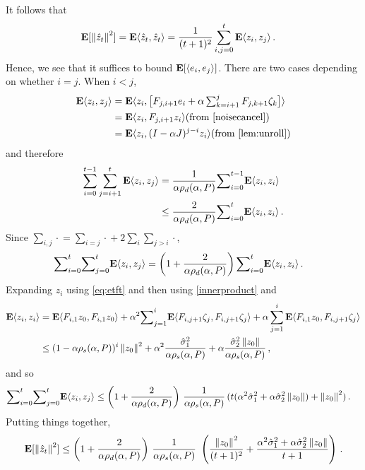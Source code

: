 It follows that 
\begin{align*}
\mathbf{E}[\left\| \hat{z}_t\right\|^2]&=\mathbf{E}\langle\hat{z}_t,\hat{z}_t\rangle
=\frac{1}{(t+1)^2} \sum_{i,j=0}^t \mathbf{E}\langle z_i,z_j\rangle\,.
\end{align*}
Hence, we see that it suffices to bound $\mathbf{E}[\langle e_i,  e_j \rangle]$.
There are two cases depending on whether $i=j$. When $i< j$,
\begin{align*}
\E\ip{z_i,z_j}
&=\E \ip{z_i,\big[F_{j,i+1} e_i+\alpha\textstyle\sum_{k=i+1}^j F_{j,k+1}\zeta_{k}\big]}\\
&=\E\ip{z_i,F_{j,i+1} z_i}  \text{(from \cref{noisecancel})}\\
&=\E\ip{z_i, (I-\alpha J)^{j-i} z_i} \text{(from \cref{lem:unroll})}
\end{align*}
and therefore
\begin{align*}
\label{inter}
\sum_{i=0}^{t-1}\sum_{j=i+1}^t \mathbf{E}\langle z_i,z_j\rangle
&=\frac1{\alpha\rho_d(\alpha,P)} {\sum}_{i=0}^{t-1}\mathbf{E}\langle z_i,z_i\rangle\\
&\leq \frac2{\alpha\rho_d(\alpha,P)}{\sum}_{i=0}^{t}\mathbf{E}\langle z_i,z_i\rangle\,.
\end{align*}
Since $\sum_{i,j}\cdot{} = \sum_{i=j}\cdot{} + 2 \sum_i \sum_{j>i} \cdot{}$,
\begin{align*}
{\sum}_{i=0}^{t}{\sum}_{j=0}^{t} \mathbf{E}\langle z_i,z_j\rangle&= \left(1+\frac2{\alpha\rho_d(\alpha,P)}\right){\sum}_{i=0}^{t}\mathbf{E}\langle z_i,z_i\rangle\,.
\end{align*}
Expanding $z_i$ using \eqref{eq:etft} and then using \cref{innerproduct} and 
\begin{align*}
\mathbf{E}\langle z_i,z_i\rangle&=\mathbf{E}\langle F_{i,1}z_0,F_{i,1}z_0\rangle+\alpha^2{\sum}_{j=1}^i\mathbf{E}\langle F_{i,j+1}\zeta_j, F_{i,j+1}\zeta_j\rangle+\alpha\sum_{j=1}^i  \mathbf{E}\langle F_{i,1} z_0, F_{i,j+1}\zeta_j\rangle\\
&\leq (1-\alpha\rho_s(\alpha,P))^i\left\| z_0\right\|^2+ \alpha^2\frac{\hat{\sigma}_1^2}{\alpha \rho_s(\alpha,P)}+ \alpha \frac{\hat{\sigma}^2_2 \left\| z_0\right\|}{\alpha\rho_s(\alpha,P)}\,,
\end{align*}
and so
\begin{align*}
{\sum}_{i=0}^{t}{\sum}_{j=0}^{t} \mathbf{E}\langle z_i,z_j\rangle
&\leq \left(1+\frac2{\alpha\rho_d(\alpha,P) }\right)\, \frac1{\alpha\rho_s(\alpha,P)}\, (t(\alpha^2\hat{\sigma}_1^2+\alpha \hat{\sigma}^2_2\left\| z_0\right\|) +\left\| z_0\right\|^2)\,.
\end{align*}
Putting things together,
\begin{align}
\mathbf{E}[\left\| \hat{z}_t\right\|^2]
\leq \left(1+\frac2{\alpha\rho_d(\alpha,P)}\right)\, \frac1{\alpha\rho_s(\alpha,P)}\, \,
\left(\frac{\left\| z_0\right\|^2}{(t+1)^2}+ \frac{\alpha^2\hat{\sigma}_1^2+\alpha \hat{\sigma}^2_2\left\| z_0\right\|}{t+1} \right)\,.
\end{align}


